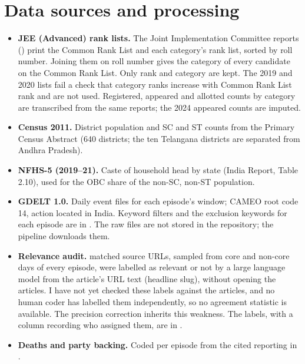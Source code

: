 \documentclass[11pt,a4paper]{article}
\begin{document}
\section{Data sources and processing}
\label{app:data}
\begin{itemize}
\item \textbf{JEE (Advanced) rank lists.} The Joint Implementation Committee reports () print the Common Rank List and each category's rank list, sorted by roll number. Joining them on roll number gives the category of every candidate on the Common Rank List. Only rank and category are kept. The 2019 and 2020 lists fail a check that category ranks increase with Common Rank List rank and are not used. Registered, appeared and allotted counts by category are transcribed from the same reports; the 2024 appeared counts are imputed.
\item \textbf{Census 2011.} District population and SC and ST counts from the Primary Census Abstract (640 districts; the ten Telangana districts are separated from Andhra Pradesh).
\item \textbf{NFHS-5 (2019--21).} Caste of household head by state (India Report, Table 2.10), used for the OBC share of the non-SC, non-ST population.
\item \textbf{GDELT 1.0.} Daily event files for each episode's window; CAMEO root code 14, action located in India. Keyword filters and the exclusion keywords for each episode are in . The raw files are not stored in the repository; the pipeline downloads them.
\item \textbf{Relevance audit.} \AuditLabelled{} matched source URLs, sampled from core and non-core days of every episode, were labelled as relevant or not by a large language model from the article's URL text (headline slug), without opening the articles. I have not yet checked these labels against the articles, and no human coder has labelled them independently, so no agreement statistic is available. The precision correction inherits this weakness. The labels, with a column recording who assigned them, are in .
\item \textbf{Deaths and party backing.} Coded per episode from the cited reporting in .
\end{itemize}
\end{document}
